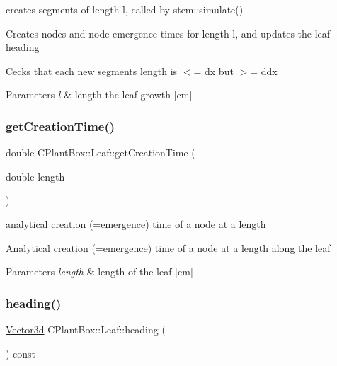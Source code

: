 creates segments of length l, called by stem\+::simulate() 

Creates nodes and node emergence times for length l, and updates the leaf heading

Cecks that each new segments length is $<$= dx but $>$= ddx


\begin{DoxyParams}{Parameters}
{\em l} & length the leaf growth \mbox{[}cm\mbox{]} \\
\hline
\end{DoxyParams}
\mbox{\label{classCPlantBox_1_1Leaf_afe95477ee2292326a11b2844ca336229}} 
\subsubsection{\texorpdfstring{get\+Creation\+Time()}{getCreationTime()}}
{\footnotesize\ttfamily double C\+Plant\+Box\+::\+Leaf\+::get\+Creation\+Time (\begin{DoxyParamCaption}\item[{double}]{length }\end{DoxyParamCaption})}



analytical creation (=emergence) time of a node at a length 

Analytical creation (=emergence) time of a node at a length along the leaf


\begin{DoxyParams}{Parameters}
{\em length} & length of the leaf \mbox{[}cm\mbox{]} \\
\hline
\end{DoxyParams}
\mbox{\label{classCPlantBox_1_1Leaf_a89394580667c92220d87eae287faf5a9}} 
\subsubsection{\texorpdfstring{heading()}{heading()}}
{\footnotesize\ttfamily \hyperlink{classCPlantBox_1_1Vector3d}{Vector3d} C\+Plant\+Box\+::\+Leaf\+::heading (\begin{DoxyParamCaption}{ }\end{DoxyParamCaption}) const}


